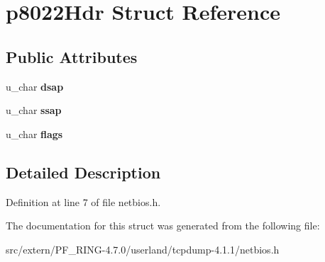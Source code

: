 \hypertarget{structp8022_hdr}{
\section{p8022Hdr Struct Reference}
\label{structp8022_hdr}
}
\subsection*{Public Attributes}
\begin{DoxyCompactItemize}
\item 
\hypertarget{structp8022_hdr_a2ead7f1ca9309cf64016da5c6bf8e09a}{
u\_\-char {\bfseries dsap}}
\label{structp8022_hdr_a2ead7f1ca9309cf64016da5c6bf8e09a}

\item 
\hypertarget{structp8022_hdr_ab979906f6e346d62bb0502e63ee84f94}{
u\_\-char {\bfseries ssap}}
\label{structp8022_hdr_ab979906f6e346d62bb0502e63ee84f94}

\item 
\hypertarget{structp8022_hdr_a59e3ea2d83a00eb5e1f49d1cb8947fd2}{
u\_\-char {\bfseries flags}}
\label{structp8022_hdr_a59e3ea2d83a00eb5e1f49d1cb8947fd2}

\end{DoxyCompactItemize}


\subsection{Detailed Description}


Definition at line 7 of file netbios.h.



The documentation for this struct was generated from the following file:\begin{DoxyCompactItemize}
\item 
src/extern/PF\_\-RING-\/4.7.0/userland/tcpdump-\/4.1.1/netbios.h\end{DoxyCompactItemize}
